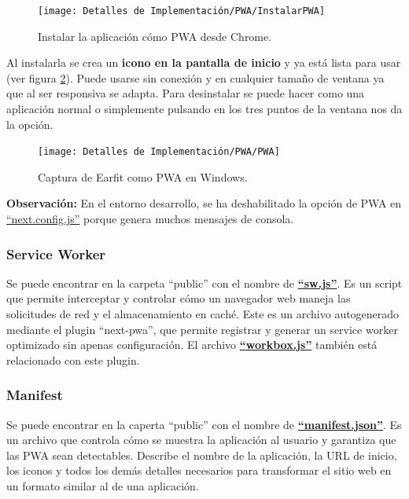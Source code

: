 \documentclass[12pt,twoside,titlepage]{report}
\begin{document}
\begin{figure}[H]
    \centering
    \texttt{[image: Detalles de Implementación/PWA/InstalarPWA]}
    \caption{Instalar la aplicación cómo PWA desde Chrome.}
    \label{fig:InstalarPWA}
\end{figure}

Al instalarla se crea un \textbf{icono en la pantalla de inicio} y ya está lista para usar (ver figura \ref{fig:PWA}). Puede usarse sin conexión y en cualquier tamaño de ventana ya que al ser responsiva se adapta. Para desinstalar se puede hacer como una aplicación normal o simplemente pulsando en los tres puntos de la ventana nos da la opción.

\begin{figure}[H]
    \centering
    \texttt{[image: Detalles de Implementación/PWA/PWA]}
    \caption{Captura de Earfit como PWA en Windows.}
    \label{fig:PWA}
\end{figure}

\textbf{Observación:} En el entorno desarrollo, se ha deshabilitado la opción de PWA en \href{https://github.com/alberttogoca/EarFit/blob/main/next.config.js}{``next.config.js''} porque genera muchos mensajes de consola.

\subsubsection{Service Worker}
\label{sec:serviceWorker}

Se puede encontrar en la carpeta ``public'' con el nombre de \href{https://github.com/alberttogoca/EarFit/blob/main/public/sw.js}{\textbf{``sw.js''}}. Es un script que permite interceptar y controlar cómo un navegador web maneja las solicitudes de red y el almacenamiento en caché. Este es un archivo autogenerado mediante el plugin ``next-pwa'', que permite registrar y generar un service worker optimizado sin apenas configuración. El archivo \href{https://github.com/alberttogoca/EarFit/blob/main/public/workbox-1846d813.js}{\textbf{``workbox.js''}} también está relacionado con este plugin.
\cite{serviceworker}

\subsubsection{Manifest}
\label{sec:manifest}

Se puede encontrar en la caperta ``public'' con el nombre de \href{https://github.com/alberttogoca/EarFit/blob/main/public/manifest.json}{\textbf{``manifest.json''}}. Es un archivo que controla cómo se muestra la aplicación al usuario y garantiza que las PWA sean detectables. Describe el nombre de la aplicación, la URL de inicio, los iconos y todos los demás detalles necesarios para transformar el sitio web en un formato similar al de una aplicación. 
\cite{manifest}
\end{document}
